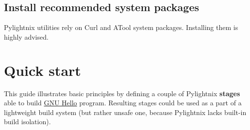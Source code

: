 \documentclass{article}
\begin{document}
\subsection{Install recommended system packages}

Pylightnix utilities rely on Curl and ATool system packages. Installing them
is highly advised.



\section{Quick start}

This guide illustrates basic principles by defining a
couple of Pylightnix \textbf{stages} able to build
\href{https://www.gnu.org/software/hello/}{GNU Hello} program. Resulting stages
could be used as a part of a lightweight build system (but rather unsafe one,
because Pylightnix lacks built-in build isolation).
\end{document}
